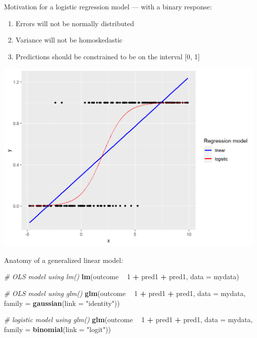 \documentclass[
]{book}
\newenvironment{Shaded}{\begin{snugshade}}{\end{snugshade}}
\newcommand{\CommentTok}[1]{\textcolor[rgb]{0.56,0.35,0.01}{\textit{#1}}}
\newcommand{\DataTypeTok}[1]{\textcolor[rgb]{0.13,0.29,0.53}{#1}}
\newcommand{\DecValTok}[1]{\textcolor[rgb]{0.00,0.00,0.81}{#1}}
\newcommand{\KeywordTok}[1]{\textcolor[rgb]{0.13,0.29,0.53}{\textbf{#1}}}
\newcommand{\NormalTok}[1]{#1}
\newcommand{\OperatorTok}[1]{\textcolor[rgb]{0.81,0.36,0.00}{\textbf{#1}}}
\newcommand{\StringTok}[1]{\textcolor[rgb]{0.31,0.60,0.02}{#1}}
\providecommand{\tightlist}{%
  \setlength{\itemsep}{0pt}\setlength{\parskip}{0pt}}
\begin{document}
Motivation for a logistic regression model --- with a binary response:

\begin{enumerate}
\def\labelenumi{\arabic{enumi}.}
\tightlist
\item
  Errors will not be normally distributed
\item
  Variance will not be homoskedastic
\item
  Predictions should be constrained to be on the interval {[}0, 1{]}
\end{enumerate}

\includegraphics{R/Rmodels/images/logistic.png}

Anatomy of a generalized linear model:

\begin{Shaded}
\begin{Highlighting}[]
  \CommentTok{# OLS model using lm()}
  \KeywordTok{lm}\NormalTok{(outcome }\OperatorTok{~}\StringTok{ }\DecValTok{1} \OperatorTok{+}\StringTok{ }\NormalTok{pred1 }\OperatorTok{+}\StringTok{ }\NormalTok{pred1, }
     \DataTypeTok{data =}\NormalTok{ mydata)}

  \CommentTok{# OLS model using glm()}
  \KeywordTok{glm}\NormalTok{(outcome }\OperatorTok{~}\StringTok{ }\DecValTok{1} \OperatorTok{+}\StringTok{ }\NormalTok{pred1 }\OperatorTok{+}\StringTok{ }\NormalTok{pred1, }
      \DataTypeTok{data =}\NormalTok{ mydata, }
      \DataTypeTok{family =} \KeywordTok{gaussian}\NormalTok{(}\DataTypeTok{link =} \StringTok{"identity"}\NormalTok{))}
 
  \CommentTok{# logistic model using glm()}
  \KeywordTok{glm}\NormalTok{(outcome }\OperatorTok{~}\StringTok{ }\DecValTok{1} \OperatorTok{+}\StringTok{ }\NormalTok{pred1 }\OperatorTok{+}\StringTok{ }\NormalTok{pred1, }
      \DataTypeTok{data =}\NormalTok{ mydata, }
      \DataTypeTok{family =} \KeywordTok{binomial}\NormalTok{(}\DataTypeTok{link =} \StringTok{"logit"}\NormalTok{))}
\end{Highlighting}
\end{Shaded}
\end{document}
